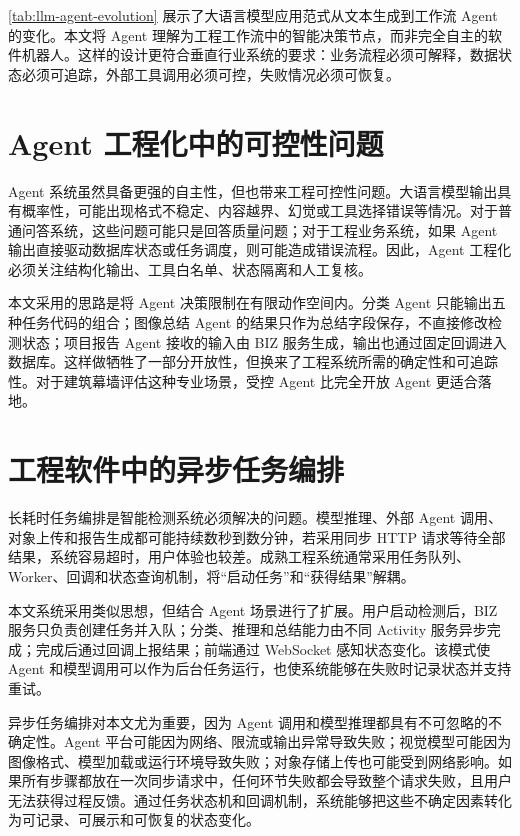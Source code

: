 \cref{tab:llm-agent-evolution} 展示了大语言模型应用范式从文本生成到工作流 Agent 的变化。本文将 Agent 理解为工程工作流中的智能决策节点，而非完全自主的软件机器人。这样的设计更符合垂直行业系统的要求：业务流程必须可解释，数据状态必须可追踪，外部工具调用必须可控，失败情况必须可恢复。

\section{Agent 工程化中的可控性问题}
\label{sec:related-agent-control}

Agent 系统虽然具备更强的自主性，但也带来工程可控性问题。大语言模型输出具有概率性，可能出现格式不稳定、内容越界、幻觉或工具选择错误等情况。对于普通问答系统，这些问题可能只是回答质量问题；对于工程业务系统，如果 Agent 输出直接驱动数据库状态或任务调度，则可能造成错误流程。因此，Agent 工程化必须关注结构化输出、工具白名单、状态隔离和人工复核。

本文采用的思路是将 Agent 决策限制在有限动作空间内。分类 Agent 只能输出五种任务代码的组合；图像总结 Agent 的结果只作为总结字段保存，不直接修改检测状态；项目报告 Agent 接收的输入由 BIZ 服务生成，输出也通过固定回调进入数据库。这样做牺牲了一部分开放性，但换来了工程系统所需的确定性和可追踪性。对于建筑幕墙评估这种专业场景，受控 Agent 比完全开放 Agent 更适合落地。

\section{工程软件中的异步任务编排}
\label{sec:related-async-workflow}

长耗时任务编排是智能检测系统必须解决的问题。模型推理、外部 Agent 调用、对象上传和报告生成都可能持续数秒到数分钟，若采用同步 HTTP 请求等待全部结果，系统容易超时，用户体验也较差。成熟工程系统通常采用任务队列、Worker、回调和状态查询机制，将“启动任务”和“获得结果”解耦。

本文系统采用类似思想，但结合 Agent 场景进行了扩展。用户启动检测后，BIZ 服务只负责创建任务并入队；分类、推理和总结能力由不同 Activity 服务异步完成；完成后通过回调上报结果；前端通过 WebSocket 感知状态变化。该模式使 Agent 和模型调用可以作为后台任务运行，也使系统能够在失败时记录状态并支持重试。

异步任务编排对本文尤为重要，因为 Agent 调用和模型推理都具有不可忽略的不确定性。Agent 平台可能因为网络、限流或输出异常导致失败；视觉模型可能因为图像格式、模型加载或运行环境导致失败；对象存储上传也可能受到网络影响。如果所有步骤都放在一次同步请求中，任何环节失败都会导致整个请求失败，且用户无法获得过程反馈。通过任务状态机和回调机制，系统能够把这些不确定因素转化为可记录、可展示和可恢复的状态变化。

